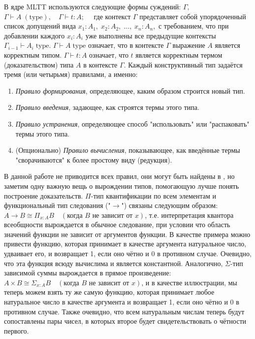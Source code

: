 \documentclass[14pt]{extarticle}
\begin{document}
	В ядре MLTT используются следующие формы суждений: 	\(\Gamma, \) \newline
	\(
	\Gamma\vdash A\;(\mathrm{type}),
	\quad
	\Gamma\vdash t : A; \quad
	\) 	где контекст \(\Gamma\) представляет собой упорядоченный список допущений вида 
		\(
		x_1\!:\!A_1,\;x_2\!:\!A_2,\;\dots,\;x_n\!:\!A_n,
		\) с требованием, что при добавлении каждого \(x_i:A_i\) уже выполнены все предыдущие контексты \(\Gamma_{i-1}\vdash A_i\;\mathrm{type}\). 
		\(\Gamma\vdash A\;\mathrm{type}\) означает, что в контексте \(\Gamma\) выражение \(A\) является корректным типом.  
		\(\Gamma\vdash t:A\) означает, что \(t\) является корректным термом (доказательством) типа \(A\) в контексте \(\Gamma\). Каждый конструктивный тип задаётся тремя (или четырьмя) правилами, а именно:
	\begin{enumerate}[leftmargin=1.5em]
		\item \emph{Правило формирования}, определяющее, каким образом строится новый тип.
		\item \emph{Правило введения}, задающее, как строятся термы этого типа.
		\item \emph{Правило устранения}, определяющее способ "использовать" или "распаковать" термы этого типа.
		\item (Опционально) \emph{Правило вычисления}, показывающее, как введённые термы "сворачиваются" к более простому виду (редукция).
	\end{enumerate}
	В данной работе не приводится всех правил, они могут быть найдены в  \cite[13-36]{martinlof1984intuitionistic}, но заметим одну важную вещь о вырождении типов, помогающую лучше понять построение доказательств.
	\(\Pi\)\nobreakdash-тип квантификации по всем элементам и функциональный тип следования ("\(\to\)") связаны следующим образом: 
	\(A\to B \cong \Pi_{x:A}B \quad (\text{когда }B\text{ не зависит от }x) \), т.е. интерпретация квантора всеобщности вырождается в обычное следование, при условии что область значений функции не зависит от аргументов функции. В качестве примера можно привести функцию, которая принимает в качестве аргумента натуральное число, удваивает его, и возвращает 1, если оно чётно и 0 в противном случае. Очевидно, что эта функция всюду вычислима и является константной.
	Аналогично, \(\Sigma\)-тип зависимой суммы вырождается в прямое произведение:
	\(
	A\times B \cong \Sigma_{x:A}B \quad (\text{когда }B\text{ не зависит от }x)
	\), и в качестве иллюстрации, мы теперь можем взять ту же самую функцию, которая принимает любое натуральное число в качестве аргумента и возвращает 1, если оно чётно и 0 в противном случае. Также очевидно, что всем натуральным числам теперь будут сопоставлены пары чисел, в которых второе будет свидетельствовать о чётности первого.
	
\end{document}
